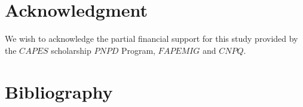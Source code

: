 \documentclass[review]{elsarticle}
\begin{document}
\section{Acknowledgment}
We wish to acknowledge the partial financial support for this study provided by the $CAPES$ 
scholarship
$PNPD$ Program, $FAPEMIG$ and $CNPQ$.


\section{Bibliography}
\end{document}
